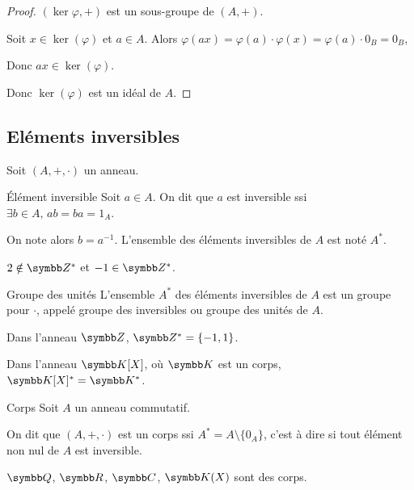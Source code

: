 \begin{proof}
    $(\ker \varphi, +)$ est un sous-groupe de $(A, +)$.

    Soit $x \in \ker(\varphi)$ et $a \in A$. Alors $\varphi(ax) = \varphi(a) \cdot \varphi(x) = \varphi(a) \cdot 0_B = 0_B$,

    Donc $ax \in \ker(\varphi)$.

    Donc $\ker(\varphi)$ est un idéal de $A$.
\end{proof}

\subsection{Eléments inversibles }

Soit $(A, +, \cdot)$ un anneau.

\begin{definition}{Élément inversible}{}
    Soit $a \in A$. On dit que $a$ est inversible ssi $\exists b \in A, \, ab = ba = 1_A$.

    On note alors $b = a^{-1}$. L'ensemble des éléments inversibles de $A$ est noté $A^*$.
\end{definition}

\begin{exemple}
    $2 \notin \Z^*$ et $-1 \in \Z^*$.
\end{exemple}

\begin{theoreme}{Groupe des unités}{}
    L'ensemble $A^*$ des éléments inversibles de $A$ est un groupe pour $\cdot$, appelé 
    groupe des inversibles ou groupe des unités de $A$.
\end{theoreme}

\begin{exemple}
    Dans l'anneau $\Z$, $\Z^* = \{-1, 1\}$.

    Dans l'anneau $\K[X]$, où $\K$ est un corps, $\K[X]^* = \K^*$.
\end{exemple}

\begin{definition}{Corps}{}
    Soit $A$ un anneau commutatif. 
    
    On dit que $(A, +, \cdot)$ est un corps 
    ssi $A^* = A \setminus \{0_A\}$, c'est à dire si tout élément non nul de $A$ est inversible.
\end{definition}

\begin{exemple}
    $\Q$, $\R$, $\C$, $\K(X)$ sont des corps.
\end{exemple}

